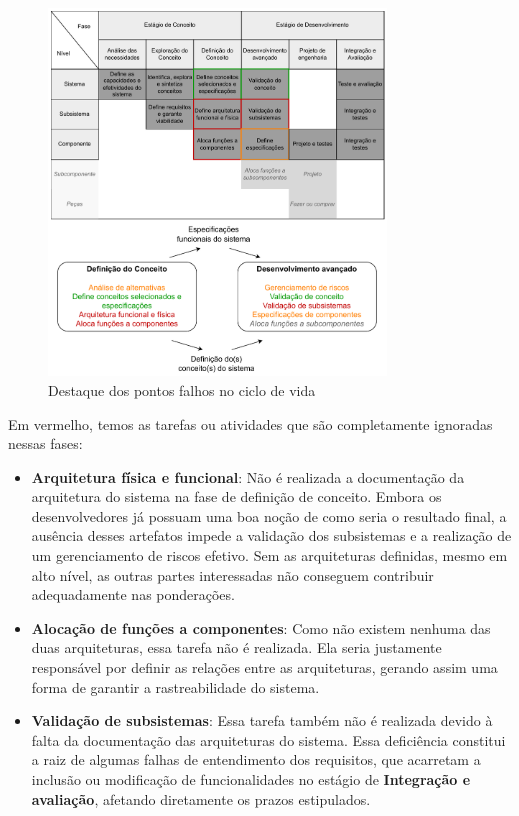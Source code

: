 	\begin{figure}[!htb]
		\centering
		\includegraphics[width=0.8\textwidth]{./figuras/lifeCycleIssues.pdf}
		\caption{Destaque dos pontos falhos no ciclo de vida}
		\label{fig:metodologia:lifeCycleIssues}
	\end{figure}

	Em vermelho, temos as tarefas ou atividades que são completamente ignoradas nessas fases:
	\begin{itemize}
		\item \textbf{Arquitetura física e funcional}: Não é realizada a documentação da arquitetura do sistema na fase de definição de conceito. Embora os desenvolvedores já possuam uma boa noção de como seria o resultado final, a ausência desses artefatos impede a validação dos subsistemas e a realização de um gerenciamento de riscos efetivo. Sem as arquiteturas definidas, mesmo em alto nível, as outras partes interessadas não conseguem contribuir adequadamente nas ponderações.
		\item \textbf{Alocação de funções a componentes}: Como não existem nenhuma das duas arquiteturas, essa tarefa não é realizada. Ela seria justamente responsável por definir as relações entre as arquiteturas, gerando assim uma forma de garantir a rastreabilidade do sistema.
		\item \textbf{Validação de subsistemas}: Essa tarefa também não é realizada devido à falta da documentação das arquiteturas do sistema. Essa deficiência constitui a raiz de algumas falhas de entendimento dos requisitos, que acarretam a inclusão ou modificação de funcionalidades no estágio de \textbf{Integração e avaliação}, afetando diretamente os prazos estipulados.
	\end{itemize}

